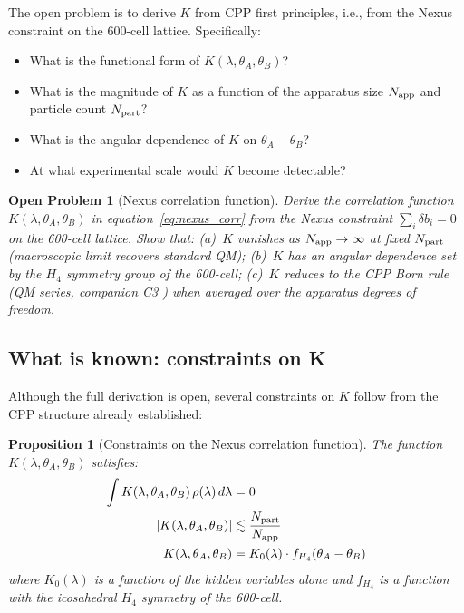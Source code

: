 \documentclass[11pt,letterpaper]{article}
\newtheorem{proposition}[theorem]{Proposition}
\newtheorem{openprob}[theorem]{Open Problem}
\begin{document}
The open problem is to derive $K$ from CPP first principles, i.e.,
from the Nexus constraint on the 600-cell lattice.  Specifically:
\begin{itemize}
\item What is the functional form of $K(\lambda, \theta_A, \theta_B)$?
\item What is the magnitude of $K$ as a function of the apparatus
  size $N_{\rm app}$ and particle count $N_{\rm part}$?
\item What is the angular dependence of $K$ on $\theta_A - \theta_B$?
\item At what experimental scale would $K$ become detectable?
\end{itemize}

\begin{openprob}[Nexus correlation function]
\label{op:nexus}
Derive the correlation function $K(\lambda, \theta_A, \theta_B)$
in equation~\eqref{eq:nexus_corr} from the Nexus constraint
$\sum_i \delta b_i = 0$ on the 600-cell lattice.  Show that:
(a)~$K$ vanishes as $N_{\rm app} \to \infty$ at fixed $N_{\rm part}$
(macroscopic limit recovers standard QM); (b)~$K$ has an angular
dependence set by the $H_4$ symmetry group of the 600-cell;
(c)~$K$ reduces to the CPP Born rule (QM series, companion C3
\citep{cpp2040c}) when averaged over the apparatus degrees of freedom.
\end{openprob}

\subsection{What is known: constraints on K}

Although the full derivation is open, several constraints on $K$
follow from the CPP structure already established:

\begin{proposition}[Constraints on the Nexus correlation function]
\label{prop:constraints}
The function $K(\lambda, \theta_A, \theta_B)$ satisfies:
\begin{align}
\int K(\lambda, \theta_A, \theta_B)\,\rho(\lambda)\,d\lambda &= 0
\label{eq:K_zero_mean} \\
|K(\lambda, \theta_A, \theta_B)| &\lesssim \frac{N_{\rm part}}{N_{\rm app}}
\label{eq:K_magnitude} \\
K(\lambda, \theta_A, \theta_B) &= K_0(\lambda) \cdot
f_{H_4}(\theta_A - \theta_B)
\label{eq:K_factored}
\end{align}
where $K_0(\lambda)$ is a function of the hidden variables alone and
$f_{H_4}$ is a function with the icosahedral $H_4$ symmetry of the
600-cell.
\end{proposition}
\end{document}
